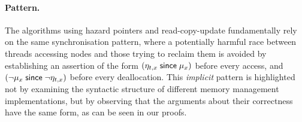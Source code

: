 \paragraph{Pattern.}
The algorithms using hazard pointers and read-copy-update fundamentally rely
on the same synchronisation pattern, where a potentially harmful race between
threads accessing nodes and those trying to reclaim them is avoided by
establishing an assertion of the form $(\eta_{t, x} \;\mathsf{since}\; \mu_x)$ before every
access, and $(\neg \mu_x \;\mathsf{since}\; \neg \eta_{t,x})$ before every deallocation.
This {\em implicit} pattern is highlighted not by examining the syntactic
structure of different memory management implementations, but by observing that
the arguments about their correctness have the same form,
as can be seen in our proofs. 



